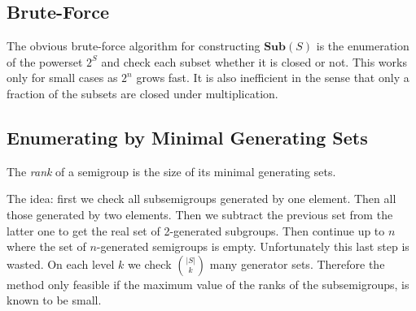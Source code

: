 \documentclass{amsart}
\newcommand{\Sub}{\mathbf{Sub}}
\theoremstyle{plain}
\theoremstyle{definition}
\begin{document}
\subsection{Brute-Force}
The obvious brute-force algorithm for constructing $\Sub(S)$ is the enumeration of the powerset $2^S$ and check each subset whether it is closed or not.
This works only for small cases as $2^n$ grows fast.
It is also inefficient in the sense that only a fraction of the subsets are closed under multiplication.
 
\subsection{Enumerating by Minimal Generating Sets}

The \emph{rank} of a semigroup is the size of its  minimal generating sets.

The idea: first we check all subsemigroups generated by one element.
Then all those generated by two elements.
Then we subtract the previous set from the latter one to get the real set of 2-generated subgroups.
Then continue up to $n$ where the set of $n$-generated semigroups is empty.
Unfortunately this last step is wasted.
On each level $k$ we check $\binom{|S|}{k}$ many generator sets.
Therefore the method only feasible if the maximum value of the ranks of the subsemigroups, is known to be small. 
\end{document}
